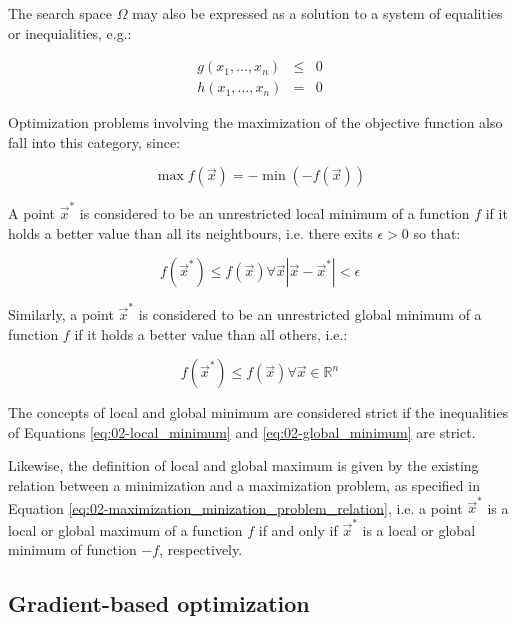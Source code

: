 The search space $\Omega$ may also be expressed as a solution to
a system of equalities or inequialities, e.g.:

\begin{eqnarray}
g(x_{1},\dots,x_{n}) & \leq & 0\nonumber \\
h(x_{1},\dots,x_{n}) & = & 0
\end{eqnarray}


Optimization problems involving the maximization of the objective
function also fall into this category, since:

\begin{equation}
\max f(\vec{x})=-\min(-f(\vec{x}))\label{eq:02-maximization_minization_problem_relation}
\end{equation}


A point $\vec{x}^{*}$ is considered to be an unrestricted local minimum
of a function $f$ if it holds a better value than all its neightbours,
i.e. there exits $\epsilon>0$ so that:

\begin{equation}
f(\vec{x}^{*})\leq f(\vec{x})\forall\vec{x}|\vec{x}-\vec{x}^{*}|<\epsilon\label{eq:02-local_minimum}
\end{equation}


Similarly, a point $\vec{x}^{*}$ is considered to be an unrestricted
global minimum of a function $f$ if it holds a better value than
all others, i.e.:

\begin{equation}
f(\vec{x}^{*})\leq f(\vec{x})\forall\vec{x}\in\mathbb{R}^{n}\label{eq:02-global_minimum}
\end{equation}


The concepts of local and global minimum are considered strict if
the inequalities of Equations \ref{eq:02-local_minimum} and \ref{eq:02-global_minimum}
are strict. 

Likewise, the definition of local and global maximum is given by the
existing relation between a minimization and a maximization problem,
as specified in Equation \ref{eq:02-maximization_minization_problem_relation},
i.e. a point $\vec{x}^{*}$ is a local or global maximum of a function
$f$ if and only if $\vec{x}^{*}$ is a local or global minimum of
function $-f$, respectively.


\subsection{Gradient-based optimization}

